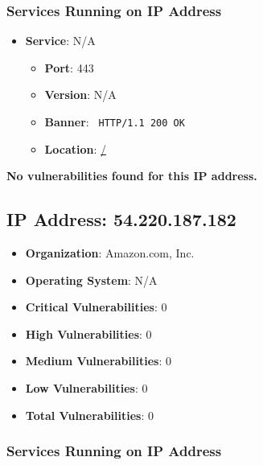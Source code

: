 \documentclass{article}
\begin{document}
\subsubsection*{Services Running on IP Address}

\begin{itemize}
    
        \item \textbf{Service}: N/A
        \begin{itemize}
            \item \textbf{Port}: 443
            \item \textbf{Version}:  N/A 
            \item \textbf{Banner}: \texttt{ HTTP/1.1 200 OK
 }
            \item \textbf{Location}: \href{ / }{ / }
        \end{itemize}
    
\end{itemize}


\textbf{No vulnerabilities found for this IP address.}


\clearpage



\subsection*{IP Address: 54.220.187.182}

\begin{itemize}
    \item \textbf{Organization}: Amazon.com, Inc.
    \item \textbf{Operating System}:  N/A 
    \item \textbf{Critical Vulnerabilities}: 0
    \item \textbf{High Vulnerabilities}: 0
    \item \textbf{Medium Vulnerabilities}: 0
    \item \textbf{Low Vulnerabilities}: 0
    \item \textbf{Total Vulnerabilities}: 0
\end{itemize}

\subsubsection*{Services Running on IP Address}
\end{document}
